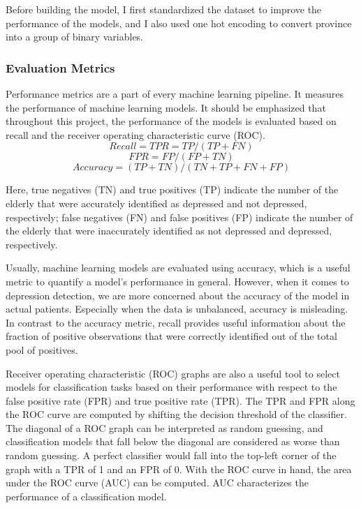 \documentclass[12pt]{article}
\begin{document}
\par Before building the model, I first standardized the dataset to improve the performance of the models, and I also used one hot encoding to convert province into a group of binary variables.

\subsubsection{Evaluation Metrics}
Performance metrics are a part of every machine learning pipeline. It measures the performance of machine learning models. It should be emphasized that throughout this project, the performance of the models is evaluated based on recall and the receiver operating characteristic curve (ROC). 
\[
    Recall = TPR = TP/(TP+FN)
\]
\[
    FPR = FP/(FP+TN)
\]
\[
    Accuracy = (TP+TN)/(TN+TP+FN+FP)
\]

Here, true negatives (TN) and true positives (TP) indicate the number of the elderly that were accurately identified as depressed and not depressed, respectively; false negatives (FN) and false positives (FP) indicate the number of the elderly that were inaccurately identified as not depressed and depressed, respectively.

Usually, machine learning models are evaluated using accuracy, which is a useful metric to quantify a model's performance in general. However, when it comes to depression detection, we are more concerned about the accuracy of the model in actual patients. Especially when the data is unbalanced, accuracy is misleading. In contrast to the accuracy metric, recall provides useful information about the fraction of positive observations that were correctly identified out of the total pool of positives.

Receiver operating characteristic (ROC) graphs are also a useful tool to select models for classification tasks based on their performance with respect to the false positive rate (FPR) and true positive rate (TPR). The TPR and FPR along the ROC curve are computed by shifting the decision threshold of the classifier. The diagonal of a ROC graph can be interpreted as random guessing, and classification models that fall below the diagonal are considered as worse than random guessing. A perfect classifier would fall into the top-left corner of the graph with a TPR of 1 and an FPR of 0. With the ROC curve in hand, the area under the ROC curve (AUC) can be computed. AUC characterizes the performance of a classification model.

\end{document}
